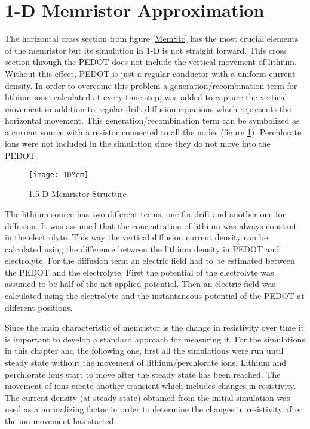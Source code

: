 {\clearpage
\section{1-D Memristor Approximation}

The horizontal cross section from figure \ref{MemStc} has the most crucial elements of the memristor but its simulation in 1-D is not straight forward. This cross section through the PEDOT does not include the vertical movement of lithium. Without this effect, PEDOT is just a regular conductor with a uniform current density. In order to overcome this problem a generation/recombination term for lithium ions, calculated at every time step, was added to capture the vertical movement in addition to regular drift diffusion equations which represents the horizontal movement. This generation/recombination term can be symbolized as a current source with a resistor connected to all the nodes (figure \ref{MemStc15}). Perchlorate ions were not included in the simulation since they do not move into the PEDOT.

\begin{figure}[!htp]
\centering
\texttt{[image: 1DMem]}
\caption{1.5-D Memristor Structure} 
\label{MemStc15}
\end{figure}

The lithium source has two different terms, one for drift and another one for diffusion. It was assumed that the concentration of lithium was always constant in the electrolyte. This way the vertical diffusion current density can be calculated using the difference between the lithium density in PEDOT and electrolyte. For the diffusion term an electric field had to be estimated between the PEDOT and the electrolyte. First the potential of the electrolyte was assumed to be half of the net applied potential. Then an electric field was calculated using the electrolyte and the instantaneous potential of the PEDOT at different positions.

Since the main characteristic of memristor is the change in resistivity over time it is important to develop a standard approach for measuring it. For the simulations in this chapter and the following one, first all the simulations were run until steady state without the movement of lithium/perchlorate ions. Lithium and perchlorate ions start to move after the steady state has been reached. The movement of ions create another transient which includes changes in resistivity. The current density (at steady state) obtained from the initial simulation was used as a normalizing factor in order to determine the changes in resistivity after the ion movement has started.

}
